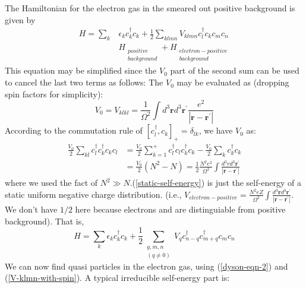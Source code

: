 The Hamiltonian for the electron gas in the smeared out positive background is given by
\begin{equation}
\begin{aligned}
H=\sum_{k} &\epsilon_{k} c_{k}^{\dagger} c_{k}+\frac{1}{2} \sum_{k l m n} V_{k l m n} c^{\dagger}_l c_{k} c_{m} c_{n}\\
& H_{\substack{positive\\background}}+H_{\substack{electron-positive\\background}}
\end{aligned}
\end{equation}
This equation may be simplified since the $V_0$ part of the second sum can be used to cancel the last two terms as follows: The $V_0$ may be evaluated as (dropping spin factors for simplicity):
\begin{equation}V_{0}=V_{k l k l}=\frac{1}{\Omega^{2}} \int d^{3} \mathbf{r} d^{3} \mathbf{r}^{\prime} \frac{e^{2}}{\left|\mathbf{r}-\mathbf{r}^{\prime}\right|}\end{equation}
According to the commutation rule of $[c^{\dagger}_l,c_k]_+=\delta_{lk}$, we have $V_0$ as:
\begin{equation}\begin{aligned}
\frac{V_{0}}{2} \sum_{k l} c_{l}^{\dagger} c_{k}^{\dagger} c_{k} c_{l} &=\frac{V_{0}}{2} \sum_{k=1}^{+} c_{l}^{\dagger} c_{l} c_{k}^{\dagger} c_{k}-\frac{V_{0}}{2} \sum_{k} c_{k}^{\dagger} c_{k} \\
&=\frac{V_{0}}{2}\left(N^{2}-N\right)=\frac{1}{2} \frac{N^{2} e^{2}}{\Omega^{2}} \int \frac{d^{3} r d^{3} \mathbf{r}^{\prime}}{\left|\mathbf{r}-\mathbf{r}^{\prime}\right|}
\end{aligned}
\label{static-self-energy}
\end{equation}
where we used the fact of $N^2\gg N$.(\ref{static-self-energy}) is just the self-energy of a static uniform negative charge distribution. (i.e., $V_{electron-positive}=\frac{N^{2} eZ}{\Omega^{2}} \int \frac{d^{3} \mathbf{r} d^{3} \mathbf{r}^{\prime}}{\left|\mathbf{r}-\mathbf{r}^{\prime}\right|}$. We don't have $1/2$ here because electrons and are distinguiable from positive background). That is,
\begin{equation}H=\sum_{k} \epsilon_{k} c_{k}^{\dagger} c_{k}+\frac{1}{2} \sum_{\substack{g, m, n \\ (q \neq 0)}} V_{q} c_{n-q}^{\dagger} c_{m+q}^{\dagger} c_{m} c_{n}\end{equation}
We can now find quasi particles in the electron gas, using (\ref{dyson-eqn-2}) and (\ref{V-klmn-with-spin}). A typical irreducible self-energy part is:

